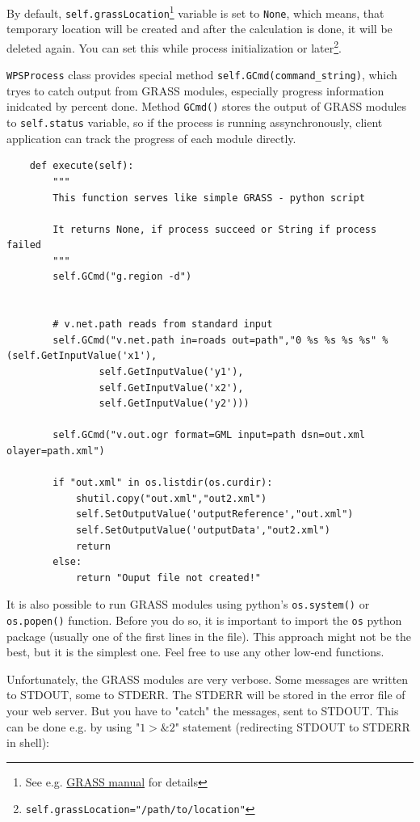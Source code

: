 \documentclass[a4paper,11pt]{article}
\begin{document}
By default, \texttt{self.grassLocation}\footnote{See e.g.
\href{http://grass.itc.it/grass63/manuals/html63\_user/helptext.html}{GRASS
manual} for details} 
 variable is set to \texttt{None},
which means, that temporary location will be created and after the
calculation is done, it will be deleted again. You can set this while
process initialization or
later\footnote{\texttt{self.grassLocation="/path/to/location"}}.

    
\texttt{WPSProcess} class provides special method
\texttt{self.GCmd(command\_string)}, which tryes to catch output from GRASS
modules, especially progress information inidcated by percent done. Method
\texttt{GCmd()} stores the output of GRASS modules to \texttt{self.status}
variable, so if the process is running assynchronously, client application
can track the progress of each module directly.

\begin{verbatim}
    def execute(self):
        """
        This function serves like simple GRASS - python script

        It returns None, if process succeed or String if process failed
        """
        self.GCmd("g.region -d")


        # v.net.path reads from standard input
        self.GCmd("v.net.path in=roads out=path","0 %s %s %s %s" % (self.GetInputValue('x1'),
                self.GetInputValue('y1'),
                self.GetInputValue('x2'),
                self.GetInputValue('y2')))

        self.GCmd("v.out.ogr format=GML input=path dsn=out.xml olayer=path.xml")

        if "out.xml" in os.listdir(os.curdir):
            shutil.copy("out.xml","out2.xml")
            self.SetOutputValue('outputReference',"out.xml")
            self.SetOutputValue('outputData',"out2.xml")
            return
        else:
            return "Ouput file not created!"
\end{verbatim}


It is also possible to run GRASS modules using python's
\texttt{os.system()} or \texttt{os.popen()} function.  Before you do so, it
is important to import the \texttt{os} python package (usually one of the
first lines in the file). This approach might not be the best, but it is
the simplest one. Feel free to use any other low-end functions.
    
    
Unfortunately, the GRASS modules are very verbose. Some messages are
written to STDOUT, some to STDERR. The STDERR will be stored in the error
file of your web server. But you have to "catch" the messages, sent to
STDOUT. This can be done e.g. by using "$1>\&2$" statement (redirecting
STDOUT to STDERR in shell):
\end{document}
